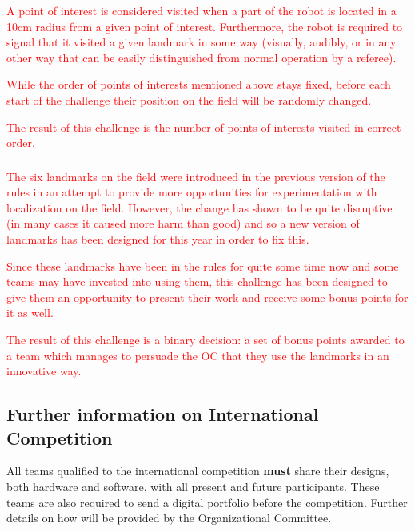 \documentclass{article}
\begin{document}
\textcolor{red}{A point of interest is considered visited when a part of the
    robot is located in a 10cm radius from a given point of interest.
    Furthermore, the robot is required to signal that it visited a given
    landmark in some way (visually, audibly, or in any other way that can be
    easily distinguished from normal operation by a referee).}

\textcolor{red}{While the order of points of interests mentioned above stays
    fixed, before each start of the challenge their position on the field will
    be randomly changed.}

\textcolor{red}{The result of this challenge is the number of points of
    interests visited in correct order.}

\subsubsection{}

\textcolor{red}{The six landmarks on the field were introduced in the previous
    version of the rules in an attempt to provide more opportunities for
    experimentation with localization on the field. However, the change has
    shown to be quite disruptive (in many cases it caused more harm than good)
    and so a new version of landmarks has been designed for this year in order
    to fix this.}

\textcolor{red}{Since these landmarks have been in the rules for quite some
    time now and some teams may have invested into using them, this challenge
    has been designed to give them an opportunity to present their work and
    receive some bonus points for it as well.}

\textcolor{red}{The result of this challenge is a binary decision: a set of
    bonus points awarded to a team which manages to persuade the OC that they
    use the landmarks in an innovative way.}

\subsection{Further information on International Competition \label{ref-061}}

All teams qualified to the international competition \textbf{must} share their
designs, both hardware and software, with all present and future participants.
These teams are also required to send a digital portfolio before the
competition. Further details on how will be provided by the Organizational
Committee.
\end{document}
